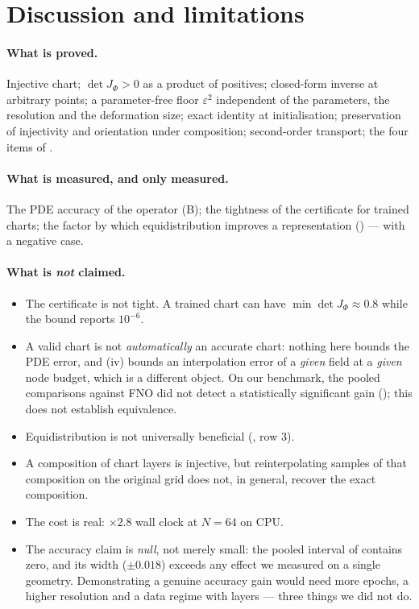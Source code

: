 \documentclass[11pt,a4paper]{article}
\theoremstyle{plain}
\theoremstyle{definition}
\newcommand{\detJ}{\det J_\Phi}
\begin{document}
\section{Discussion and limitations}
\label{sec:discussion}

\paragraph{What is proved.}
Injective chart; $\detJ>0$ as a product of positives; closed-form inverse at
arbitrary points; a parameter-free floor $\varepsilon^2$ independent of the
parameters, the resolution and the deformation size; exact identity at
initialisation; preservation of injectivity and orientation under composition;
second-order transport; the four
items of .

\paragraph{What is measured, and only measured.}
The PDE accuracy of the operator (B); the tightness of the
certificate for trained charts; the factor by which equidistribution improves a
representation () — with a negative case.

\paragraph{What is \emph{not} claimed.}
\begin{itemize}
\item The certificate is not tight.  A trained chart can have
  $\min\detJ\approx0.8$ while the bound reports $10^{-6}$.
\item A valid chart is not \emph{automatically} an accurate chart: nothing here
  bounds the PDE error, and (iv) bounds an interpolation error of a
  \emph{given} field at a \emph{given} node budget, which is a different object.
  On our benchmark, the pooled comparisons against FNO did not detect a
  statistically significant gain (); this does not establish
  equivalence.
\item Equidistribution is not universally beneficial (, row 3).
\item A composition of chart layers is injective, but reinterpolating samples
  of that composition on the original grid does not, in general, recover the
  exact composition.
\item The cost is real: $\times2.8$ wall clock at $N=64$ on CPU.
\item The accuracy claim is \emph{null}, not merely small: the pooled interval of
   contains zero, and its width ($\pm0.018$) exceeds any effect
  we measured on a single geometry.  Demonstrating a genuine accuracy gain would
  need more epochs, a higher resolution and a data regime with layers --- three
  things we did not do.
\end{itemize}
\end{document}
